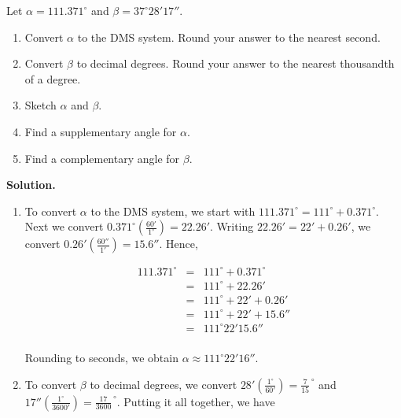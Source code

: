\documentclass[12pt]{ximera}
\begin{document}
\begin{example} \label{degreeex}  Let $\alpha = 111.371^{\circ}$  and $\beta = 37^{\circ}28'17''$.

\begin{enumerate}

\item  Convert $\alpha$ to the DMS system.  Round your answer to the nearest second.

\item  Convert $\beta$ to decimal degrees.  Round your answer to the nearest thousandth of a degree.

\item  Sketch $\alpha$ and $\beta$.

\item  Find a supplementary angle for $\alpha$.

\item  Find a complementary angle for $\beta$.

\end{enumerate}

{\bf Solution.}

\begin{enumerate}

\item  To convert $\alpha$ to the DMS system, we start with $111.371^{\circ} = 111^{\circ}+ 0.371^{\circ}$.  Next we convert $0.371^{\circ} \left(\frac{60'}{1^{\circ}}\right) = 22.26'$.  Writing $22.26' = 22'+ 0.26'$, we convert $0.26' \left( \frac{60''}{1'} \right) = 15.6''$.  Hence,

\[ \begin{array}{rcl}

111.371^{\circ} & = & 111^{\circ} + 0.371^{\circ} \\
                & = & 111^{\circ} + 22.26' \\
                & = & 111^{\circ} + 22' + 0.26' \\
                & = & 111^{\circ} + 22' + 15.6'' \\
                & = & 111^{\circ}22'15.6'' \\ \end{array} \]

Rounding to seconds, we obtain $\alpha \approx 111^{\circ}22'16''$.

\item  To convert $\beta$ to decimal degrees, we convert $28' \left(\frac{1^{\circ}}{60'}\right) = \frac{7}{15}^{\, \circ}$ and $17''\left(\frac{1^{\circ}}{3600'}\right) = \frac{17}{3600}^{\, \circ}$.  Putting it all together, we have


\end{enumerate}
\end{example}
\end{document}
